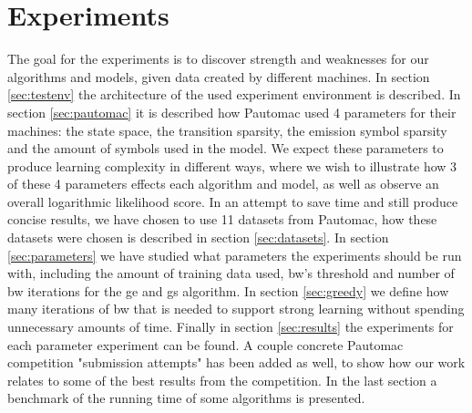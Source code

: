 \chapter{Experiments}
\label{chap:experiments}

The goal for the experiments is to discover strength and weaknesses for our algorithms and models, given data created by different machines. In section \ref{sec:testenv} the architecture of the used experiment environment is described. In section \ref{sec:pautomac} it is described how Pautomac used 4 parameters for their machines: the state space, the transition sparsity, the emission symbol sparsity and the amount of symbols used in the model. We expect these parameters to produce learning complexity in different ways, where we wish to illustrate how 3 of these 4 parameters effects each algorithm and model, as well as observe an overall logarithmic likelihood score. In an attempt to save time and still produce concise results, we have chosen to use 11 datasets from Pautomac, how these datasets were chosen is described in section \ref{sec:datasets}. In section \ref{sec:parameters} we have studied what parameters the experiments should be run with, including the amount of training data used, \gls{bw}'s threshold and number of \gls{bw} iterations for the \gls{ge} and \gls{gs} algorithm. In section \ref{sec:greedy} we define how many iterations of \gls{bw} that is needed to support strong learning without spending unnecessary amounts of time.
Finally in section \ref{sec:results} the experiments for each parameter experiment can be found. A couple concrete Pautomac competition "submission attempts" has been added as well, to show how our work relates to some of the best results from the competition. In the last section a benchmark of the running time of some algorithms is presented.

%



\FloatBarrier


